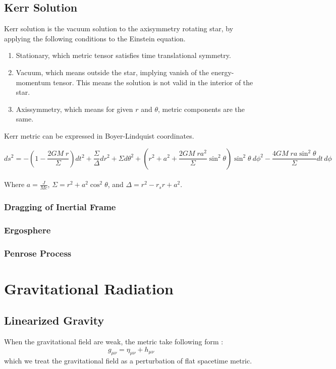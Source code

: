 \documentclass[12pt]{article}
\theoremstyle{mystyle}{\newtheorem{definition}{Definition}[section]}
\theoremstyle{mystyle}{\newtheorem{theorem}[definition]{Theorem}}
\theoremstyle{mystyle}{\newtheorem*{remark}{Remark}}
\theoremstyle{mystyle}{\newtheorem*{example}{Example}}
\theoremstyle{mystyle}{\newtheorem*{examples}{Examples}}
\theoremstyle{cstyle}{\newtheorem*{cthm}{}}
\begin{document}
\subsection{Kerr Solution}
Kerr solution is the vacuum solution to the axisymmetry rotating star, by applying the following conditions to the Einstein equation.
\begin{enumerate}
  \item Stationary, which metric tensor satisfies time translational symmetry.
  \item Vacuum, which means outside the star, implying vanish of the energy-momentum tensor. This means the solution is not valid in the interior of the star.
  \item Axissymmetry, which means for given \(r\) and \(\theta\), metric components are the same.
\end{enumerate}
Kerr metric can be expressed in Boyer-Lindquist coordinates.
\begin{cthm}
  \[ds^{2} =
    -\left( 1 - \frac{2GM\; r}{\Sigma} \right) dt^{2} + \frac{\Sigma}{\Delta} dr^{2} + \Sigma d\theta^{2} +
    \left(r^2+ a^2 + \frac{2GM\; r a^{2}}{\Sigma} \sin^{2}\theta \right) \sin^{2}\theta \ d\phi^{2} -
    \frac{4GM\; ra \sin^{2} \theta}{\Sigma} dt \, d\phi\]\\
  Where \(a = \frac{J}{Mc}\), \(\Sigma = r^{2} + a^{2} \cos^{2}\theta\), and \(\Delta = r^{2} - r_{s} r + a^{2}\).
\end{cthm}

\subsubsection{Dragging of Inertial Frame}

\subsubsection{Ergosphere}

\subsubsection{Penrose Process}

\section{Gravitational Radiation}
\subsection{Linearized Gravity}
When the gravitational field are weak, the metric take following form :\[g_{\mu\nu} = \eta_{\mu\nu} + h_{\mu\nu} \]
which we treat the gravitational field as a perturbation of flat spacetime metric.
\end{document}
